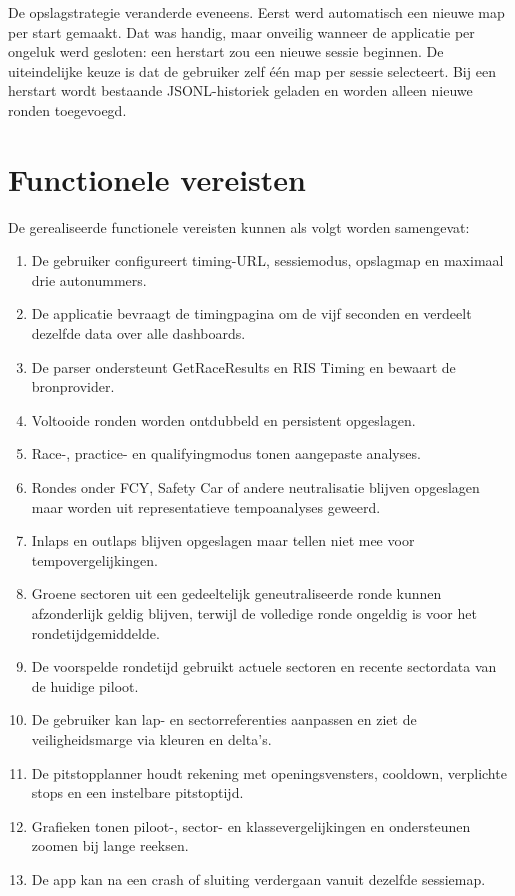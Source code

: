 De opslagstrategie veranderde eveneens. Eerst werd automatisch een nieuwe map per start gemaakt. Dat was handig, maar onveilig wanneer de applicatie per ongeluk werd gesloten: een herstart zou een nieuwe sessie beginnen. De uiteindelijke keuze is dat de gebruiker zelf één map per sessie selecteert. Bij een herstart wordt bestaande JSONL-historiek geladen en worden alleen nieuwe ronden toegevoegd.

\section{Functionele vereisten}
De gerealiseerde functionele vereisten kunnen als volgt worden samengevat:

\begin{enumerate}[label=F\arabic*.]
  \item De gebruiker configureert timing-URL, sessiemodus, opslagmap en maximaal drie autonummers.
  \item De applicatie bevraagt de timingpagina om de vijf seconden en verdeelt dezelfde data over alle dashboards.
  \item De parser ondersteunt GetRaceResults en RIS Timing en bewaart de bronprovider.
  \item Voltooide ronden worden ontdubbeld en persistent opgeslagen.
  \item Race-, practice- en qualifyingmodus tonen aangepaste analyses.
  \item Rondes onder FCY, Safety Car of andere neutralisatie blijven opgeslagen maar worden uit representatieve tempoanalyses geweerd.
  \item Inlaps en outlaps blijven opgeslagen maar tellen niet mee voor tempovergelijkingen.
  \item Groene sectoren uit een gedeeltelijk geneutraliseerde ronde kunnen afzonderlijk geldig blijven, terwijl de volledige ronde ongeldig is voor het rondetijdgemiddelde.
  \item De voorspelde rondetijd gebruikt actuele sectoren en recente sectordata van de huidige piloot.
  \item De gebruiker kan lap- en sectorreferenties aanpassen en ziet de veiligheidsmarge via kleuren en delta's.
  \item De pitstopplanner houdt rekening met openingsvensters, cooldown, verplichte stops en een instelbare pitstoptijd.
  \item Grafieken tonen piloot-, sector- en klassevergelijkingen en ondersteunen zoomen bij lange reeksen.
  \item De app kan na een crash of sluiting verdergaan vanuit dezelfde sessiemap.
\end{enumerate}

